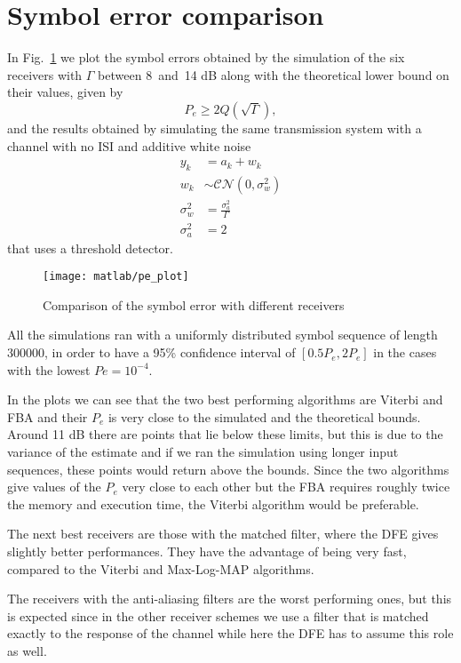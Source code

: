 \documentclass[a4paper,oneside]{article}
\newcommand{\distr}[0]{\sim}
\begin{document}
\section{Symbol error comparison}
In Fig.~\ref{plot:pe_all} we plot the symbol errors obtained by the
simulation of the six receivers with $\Gamma$ between 8~and~14 dB
along with the theoretical lower bound on their values, given by
\begin{equation}
  P_e \geq 2 Q \left(\sqrt{\Gamma}\right) ,
\end{equation}
and the results obtained by simulating the same transmission system
with a channel with no ISI and additive white noise
\begin{align}
  y_k &= a_k + w_k \\
  w_k & \distr \mathcal{CN}(0, \sigma^2_w) \\
  \sigma^2_w &= \frac{\sigma^2_a}{\Gamma} \\
  \sigma^2_a &= 2 
\end{align}
that uses a threshold detector.

\begin{figure}[htbp]
  \centering
  \texttt{[image: matlab/pe\_plot]}
  \caption{Comparison of the symbol error with different receivers}
  \label{plot:pe_all}
\end{figure}
All the simulations ran with a uniformly distributed symbol sequence
of length 300000, in order to have a 95\% confidence interval of
$[0.5P_e, 2P_e]$ in the cases with the lowest $Pe = 10^{-4}$.

In the plots we can see that the two best performing algorithms are
Viterbi and FBA and their $P_e$ is very close to the simulated and the
theoretical bounds. Around 11 dB there are points that lie
below these limits, but this is due to the variance of the estimate
and if we ran the simulation using longer input sequences, these
points would return above the bounds. Since the two algorithms give
values of the $P_e$ very close to each other but the FBA requires
roughly twice the memory and execution time, the Viterbi algorithm
would be preferable.

The next best receivers are those with the matched filter, where the
DFE gives slightly better performances. They have the advantage of
being very fast, compared to the Viterbi and Max-Log-MAP algorithms.

The receivers with the anti-aliasing filters are the worst performing
ones, but this is expected since in the other receiver schemes we use
a filter that is matched exactly to the response of the channel while
here the DFE has to assume this role as well.
\end{document}
